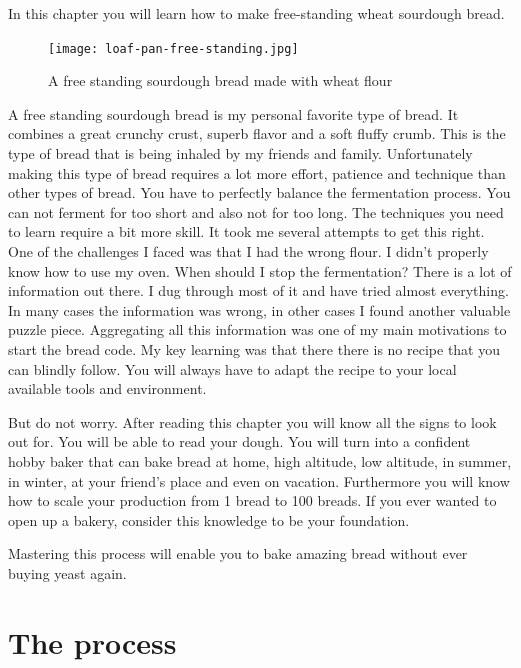 In this chapter you will learn how to make
free-standing wheat sourdough bread.

\begin{figure}[!htb]
  \texttt{[image: loaf-pan-free-standing.jpg]}
  \caption{A free standing sourdough bread made with wheat flour}
\end{figure}

A free standing sourdough bread is my personal favorite
type of bread. It combines a great crunchy crust, superb
flavor and a soft fluffy crumb. This is the type of bread
that is being inhaled by my friends and family. Unfortunately
making this type of bread requires a lot more effort, patience
and technique than other types of bread. You have to perfectly
balance the fermentation process. You can not ferment for too
short and also not for too long. The techniques you need to
learn require a bit more skill. It took me several attempts
to get this right. One of the challenges I faced was that
I had the wrong flour. I didn't properly know how to use my oven.
When should I stop the fermentation? There is a lot of information
out there. I dug through most of it and have tried almost everything.
In many cases the information was wrong, in other cases I
found another valuable puzzle piece. Aggregating all this
information was one of my main motivations to start the bread code.
My key learning was that there there is no recipe that
you can blindly follow. You will always have to adapt the recipe
to your local available tools and environment.

But do not worry. After reading this chapter you will know
all the signs to look out for. You will be able to read your dough.
You will turn into a confident hobby baker that can bake bread
at home, high altitude, low altitude, in summer, in winter,
at your friend's place and even on vacation. Furthermore
you will know how to scale your production from 1 bread to 100 breads. If you
ever wanted to open up a bakery, consider this knowledge to
be your foundation.

Mastering this process will enable you to bake amazing bread without
ever buying yeast again.

\section{The process}

